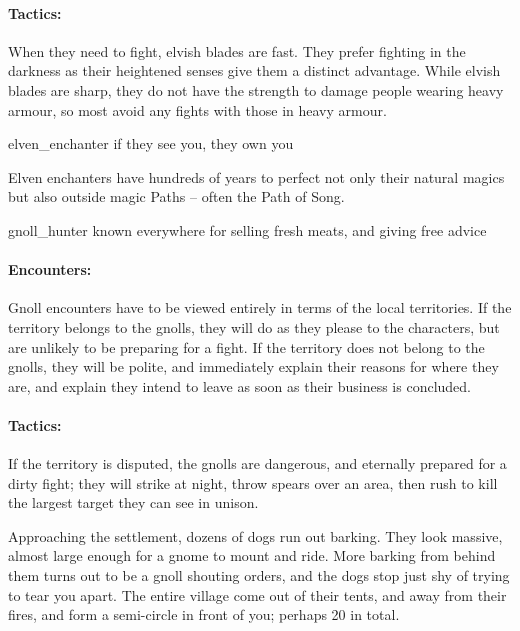 \begin{multicols}{2}
\paragraph{Tactics:} When they need to fight, elvish blades are fast.
They prefer fighting in the darkness as their heightened senses give them a distinct advantage.
While elvish blades are sharp, they do not have the strength to damage people wearing heavy armour, so most avoid any fights with those in heavy armour.



  {elven_enchanter}%
  {if they see you, they own you}%

Elven enchanters have hundreds of years to perfect not only their natural magics but also outside magic Paths -- often the Path of Song.


\showStdSpells

\label{best_gnolls}


  {gnoll_hunter}%
  {known everywhere for selling fresh meats, and giving free advice}%



\paragraph{Encounters:} Gnoll encounters have to be viewed entirely in terms of the local territories.
If the territory belongs to the gnolls, they will do as they please to the characters, but are unlikely to be preparing for a fight.
If the territory does not belong to the gnolls, they will be polite, and immediately explain their reasons for where they are, and explain they intend to leave as soon as their business is concluded.
\paragraph{Tactics:}
If the territory is disputed, the gnolls are dangerous, and eternally prepared for a dirty fight; they will strike at night, throw spears over an area, then rush to kill the largest target they can see in unison.

\begin{boxtext}

  Approaching the settlement, dozens of dogs run out barking.
  They look massive, almost large enough for a gnome to mount and ride.
  More barking from behind them turns out to be a gnoll shouting orders, and the dogs stop just shy of trying to tear you apart.
  The entire village come out of their tents, and away from their fires, and form a semi-circle in front of you; perhaps 20 in total.


\end{boxtext}
\end{multicols}
